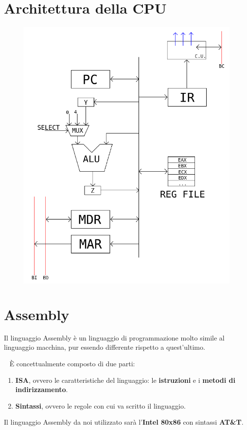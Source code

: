 \documentclass[12pt,oneside]{book}
\begin{document}
\section{Architettura della CPU}
\begin{figure}[h]
    \centering
    \includegraphics[scale=0.6]{modello_architettura_cpu}
\end{figure}

\section{Assembly}
Il linguaggio Assembly è un linguaggio di programmazione molto simile al linguaggio macchina, pur essendo differente rispetto a quest'ultimo.

~\newline
È concettualmente composto di due parti:
\begin{enumerate}
    \item \textbf{ISA}, ovvero le caratteristiche del linguaggio: le \textbf{istruzioni} e i \textbf{metodi di indirizzamento}.
    \item \textbf{Sintassi}, ovvero le regole con cui va scritto il linguaggio.
\end{enumerate}
Il linguaggio Assembly da noi utilizzato sarà l'\textbf{Intel 80x86} con sintassi \textbf{AT\&T}.
\end{document}
